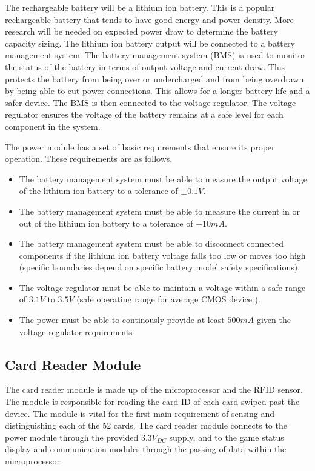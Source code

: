 \documentclass[12pt]{article}
\begin{document}
The rechargeable battery will be a lithium ion battery. This is a popular rechargeable battery that tends to have  good energy and power density. More research will be needed on expected power draw to determine the battery capacity sizing. The lithium ion battery output will be connected to a battery management system. The battery management system (BMS) is used to monitor the status of the battery in terms of output voltage and current draw. This protects the battery from being over or undercharged and from being overdrawn by being able to cut power connections. This allows for a longer battery life and a safer device. The BMS is then connected to the voltage regulator. The voltage regulator ensures the voltage of the battery remains at a safe level for each component in the system.

The power module has a set of basic requirements that ensure its proper operation. These requirements are as follows.

\begin{itemize}
\item The battery management system must be able to measure the output voltage of the lithium ion battery to a tolerance of $\pm0.1V$.
\item The battery management system must be able to measure the current in or out of the lithium ion battery to a tolerance of $\pm10mA$.
\item The battery management system must be able to disconnect connected components if the lithium ion battery voltage falls too low or moves too high (specific boundaries depend on specific battery model safety specifications).
\item The voltage regulator must be able to maintain a voltage within a safe range of $3.1V$ to $3.5V$ (safe operating range for average CMOS device \cite{TI_inverter}).
\item The power must be able to continously provide at least $500mA$ given the voltage regulator requirements
\end{itemize}

\subsection{Card Reader Module}

The card reader module is made up of the microprocessor and the RFID sensor. The module is responsible for reading the card ID of each card swiped past the device. The module is vital for the first main requirement of sensing and distinguishing each of the 52 cards. The card reader module connects to the power module through the provided $3.3V_{DC}$ supply, and to the game status display and communication modules through the passing of data within the microprocessor.
\end{document}
